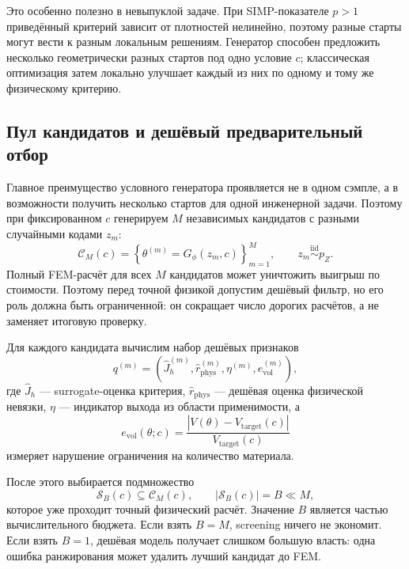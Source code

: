 Это особенно полезно в невыпуклой задаче. При SIMP-показателе $p>1$ приведённый критерий зависит от плотностей нелинейно, поэтому разные старты могут вести к разным локальным решениям. Генератор способен предложить несколько геометрически разных стартов под одно условие $c$; классическая оптимизация затем локально улучшает каждый из них по одному и тому же физическому критерию.

\subsection{Пул кандидатов и дешёвый предварительный отбор}

Главное преимущество условного генератора проявляется не в одном сэмпле, а в возможности получить несколько стартов для одной инженерной задачи. Поэтому при фиксированном $c$ генерируем $M$ независимых кандидатов с разными случайными кодами $z_m$:
\begin{equation}
 \mathcal C_M(c)
 =
 \left\{
  \theta^{(m)}=G_\phi(z_m,c)
 \right\}_{m=1}^{M},
 \qquad
 z_m\overset{\mathrm{iid}}{\sim}p_Z.
\end{equation}
Полный FEM-расчёт для всех $M$ кандидатов может уничтожить выигрыш по стоимости. Поэтому перед точной физикой допустим дешёвый фильтр, но его роль должна быть ограниченной: он сокращает число дорогих расчётов, а не заменяет итоговую проверку.

Для каждого кандидата вычислим набор дешёвых признаков
\begin{equation}
 q^{(m)}
 =
 \left(
  \widehat J_h^{(m)},
  \widehat r_{\mathrm{phys}}^{(m)},
  \eta^{(m)},
  e_{\mathrm{vol}}^{(m)}
 \right),
\end{equation}
где $\widehat J_h$ --- surrogate-оценка критерия, $\widehat r_{\mathrm{phys}}$ --- дешёвая оценка физической невязки, $\eta$ --- индикатор выхода из области применимости, а
\begin{equation}
 e_{\mathrm{vol}}(\theta;c)
 =
 \frac{\left|V(\theta)-V_{\mathrm{target}}(c)\right|}
 {V_{\mathrm{target}}(c)}
\end{equation}
измеряет нарушение ограничения на количество материала.

После этого выбирается подмножество
\begin{equation}
 \mathcal S_B(c)
 \subseteq
 \mathcal C_M(c),
 \qquad
 |\mathcal S_B(c)|=B\ll M,
\end{equation}
которое уже проходит точный физический расчёт. Значение $B$ является частью вычислительного бюджета. Если взять $B=M$, screening ничего не экономит. Если взять $B=1$, дешёвая модель получает слишком большую власть: одна ошибка ранжирования может удалить лучший кандидат до FEM.

